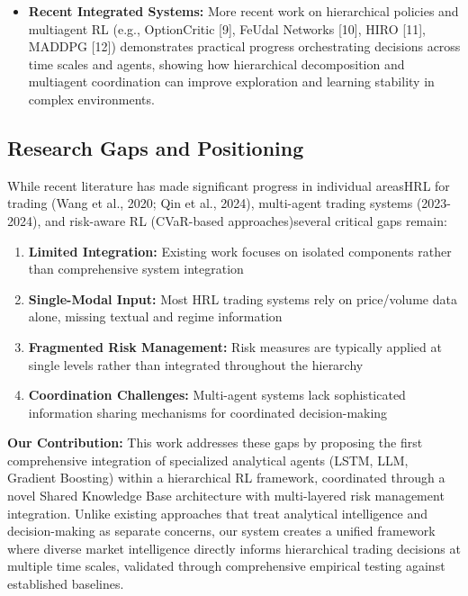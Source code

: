 \documentclass[11pt]{article}
\begin{document}
\begin{itemize}
\item   \textbf{Recent Integrated Systems:} More recent work on hierarchical policies and multiagent RL (e.g., OptionCritic [9], FeUdal Networks [10], HIRO [11], MADDPG [12]) demonstrates practical progress orchestrating decisions across time scales and agents, showing how hierarchical decomposition and multiagent coordination can improve exploration and learning stability in complex environments.

\end{itemize}
\subsection{Research Gaps and Positioning}

While recent literature has made significant progress in individual areasHRL for trading (Wang et al., 2020; Qin et al., 2024), multi-agent trading systems (2023-2024), and risk-aware RL (CVaR-based approaches)several critical gaps remain:

\begin{enumerate}
\item \textbf{Limited Integration:} Existing work focuses on isolated components rather than comprehensive system integration
\item \textbf{Single-Modal Input:} Most HRL trading systems rely on price/volume data alone, missing textual and regime information
\item \textbf{Fragmented Risk Management:} Risk measures are typically applied at single levels rather than integrated throughout the hierarchy
\item \textbf{Coordination Challenges:} Multi-agent systems lack sophisticated information sharing mechanisms for coordinated decision-making

\end{enumerate}
\textbf{Our Contribution:} This work addresses these gaps by proposing the first comprehensive integration of specialized analytical agents (LSTM, LLM, Gradient Boosting) within a hierarchical RL framework, coordinated through a novel Shared Knowledge Base architecture with multi-layered risk management integration. Unlike existing approaches that treat analytical intelligence and decision-making as separate concerns, our system creates a unified framework where diverse market intelligence directly informs hierarchical trading decisions at multiple time scales, validated through comprehensive empirical testing against established baselines.
\end{document}
